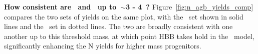 \documentclass[\main/notes.tex]{subfiles}
\begin{document}
\par 
\textbf{How consistent are~\citet{Cristallo2011, Cristallo2015} 
and~\citet{Karakas2010} up to~$\sim$3 - 4~\msun?} 
Figure~\ref{fig:n_agb_yields_comp} compares the two sets of yields on the same 
plot, with the~\citet{Cristallo2011, Cristallo2015} set shown in solid lines 
and the~\citet{Karakas2010} set in dotted lines. 
The two are broadly consistent with one another up to this threshold mass, at 
which point HBB takes hold in the~\citet{Karakas2010} model, significantly 
enhancing the N yields for higher mass progenitors. 
\end{document}
